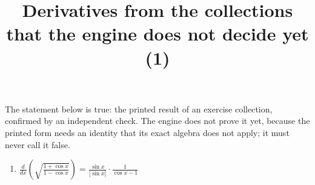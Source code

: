 \documentclass[11pt,a4paper]{article}
\title{Derivatives from the collections that the engine does not decide yet (1)}
\author{}
\date{}
\begin{document}
\maketitle
The statement below is true: the printed result of an exercise collection, confirmed by an independent check. The engine does not prove it yet, because the printed form needs an identity that its exact algebra does not apply; it must never call it false.

\begin{enumerate}
\item $\displaystyle \frac{d}{dx}\left( \sqrt{\frac{1 + \cos x}{1 - \cos x}} \right) = \frac{\sin x}{|\sin x|} \cdot \frac{1}{\cos x - 1}$
\end{enumerate}
\end{document}
